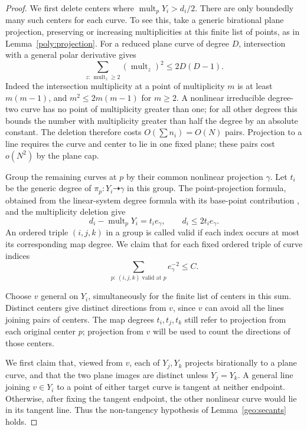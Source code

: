 \begin{proof}
We first delete centers where
$\operatorname{mult}_pY_i>d_i/2$. There are only boundedly many such
centers for each curve. To see this, take a generic birational plane
projection, preserving or increasing multiplicities at this finite
list of points, as in Lemma~\ref{poly:projection}. For a reduced plane
curve of degree $D$, intersection with a general polar derivative
gives
\begin{equation}\label{geo:polar-bound}
 \sum_{z:\,\operatorname{mult}_z\ge2}
       (\operatorname{mult}_z)^2\le 2D(D-1).
\end{equation}
Indeed the intersection multiplicity at a point of multiplicity $m$
is at least $m(m-1)$, and $m^2\le2m(m-1)$ for $m\ge2$.
A nonlinear irreducible degree-two curve has no point of multiplicity
greater than one; for all other degrees this bounds the number with
multiplicity greater than half the degree by an absolute constant.
The deletion therefore costs $O(\sum n_i)=O(N)$ pairs.
Projection to a line requires the curve and center to lie in one fixed
plane; these pairs cost $o(N^2)$ by the plane cap.

Group the remaining curves at $p$ by their common nonlinear projection
$\gamma$. Let $t_i$ be the generic degree of $\pi_p:Y_i\dashrightarrow
\gamma$ in this group.  The point-projection formula, obtained from the
linear-system degree formula with its base-point contribution
\cite[Proposition~4.4]{fulton1998}, and the multiplicity deletion give
\begin{equation}\label{geo:map-degree-comparison}
 d_i-\operatorname{mult}_pY_i=t_i e_\gamma,
 \qquad d_i\le2t_i e_\gamma.
\end{equation}
An ordered triple $(i,j,k)$ in a group is called valid if each index
occurs at most its corresponding map degree. We claim that for each
fixed ordered triple of curve indices
\begin{equation}\label{geo:triple-center-bound}
 \sum_{p:\,(i,j,k)\text{ valid at }p} e_\gamma^{-2}\le C.
\end{equation}

Choose $v$ general on $Y_i$, simultaneously for the finite list of
centers in this sum. Distinct centers give distinct directions from
$v$, since $v$ can avoid all the lines joining pairs of centers.
The map degrees $t_i,t_j,t_k$ still refer to projection from each
original center $p$; projection from $v$ will be used to count the
directions of those centers.

We first claim that, viewed from $v$, each of $Y_j,Y_k$ projects
birationally to a plane curve, and that the two plane images are
distinct unless $Y_j=Y_k$. A general line joining $v\in Y_i$ to a
point of either target curve is tangent at neither endpoint.
Otherwise, after fixing the tangent endpoint, the other nonlinear
curve would lie in its tangent line. Thus the non-tangency hypothesis
of Lemma~\ref{geo:secants} holds.


\end{proof}
